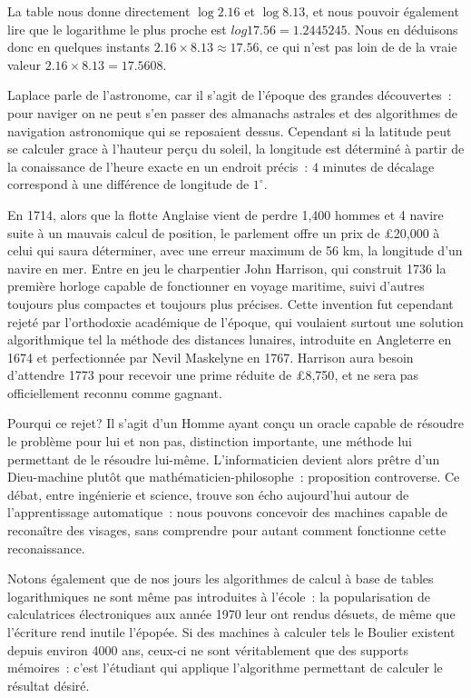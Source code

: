 La table nous donne directement $\log{2.16}$ et $\log{8.13}$, et nous pouvoir également lire que le logarithme le plus proche est $log{17.56} = 1.2445245$. Nous en déduisons donc en quelques instants $2.16\times{8.13} \approx{17.56}$, ce qui n'est pas loin de de la vraie valeur $2.16\times{8.13}={17.5608}$.

Laplace parle de l'astronome, car il s'agit de l'époque des grandes découvertes~: pour naviger on ne peut s'en passer des almanachs astrales et des algorithmes de navigation astronomique qui se reposaient dessus. Cependant si la latitude peut se calculer grace à l'hauteur perçu du soleil, la longitude est déterminé à partir de la conaissance de l'heure exacte en un endroit précis~: $4$ minutes de décalage correspond à une différence de longitude de $1^{\circ}$.  

En 1714, alors que la flotte Anglaise vient de perdre 1,400 hommes et 4 navire suite à un mauvais calcul de position, le parlement offre un prix de \pounds{20,000} à celui qui saura déterminer, avec une erreur maximum de 56 km, la longitude d'un navire en mer\cite{longitude}. Entre en jeu le charpentier John Harrison, qui construit 1736 la première horloge capable de fonctionner en voyage maritime, suivi d'autres toujours plus compactes et toujours plus précises. Cette invention fut cependant rejeté par l'orthodoxie académique de l'époque, qui voulaient surtout une solution algorithmique tel la méthode des distances lunaires, introduite en Angleterre en 1674 et perfectionnée par Nevil Maskelyne en 1767\cite{history-longitude}. Harrison aura besoin d'attendre 1773 pour recevoir une prime réduite de \pounds{8,750}, et ne sera pas officiellement reconnu comme gagnant.

Pourqui ce rejet? Il s'agit d'un Homme ayant conçu un \og{}oracle\fg{} capable de résoudre le problème pour lui et non pas, distinction importante, une méthode lui permettant de le résoudre lui-même. L'informaticien devient alors prêtre d'un Dieu-machine plutôt que mathématicien-philosophe~: proposition controverse. Ce débat, entre ingénierie et science, trouve son écho aujourd'hui autour de l'apprentissage automatique~: nous pouvons concevoir des machines capable de reconaître des visages, sans comprendre pour autant comment fonctionne cette reconaissance. 

Notons également que de nos jours les algorithmes de calcul à base de tables logarithmiques ne sont même pas introduites à l'école~: la popularisation de calculatrices électroniques aux année 1970 leur ont rendus désuets, de même que l'écriture rend inutile l'épopée. Si des machines à calculer tels le Boulier existent depuis environ 4000 ans, ceux-ci ne sont véritablement que des supports mémoires~: c'est l'étudiant qui applique l'algorithme permettant de calculer le résultat désiré. 

